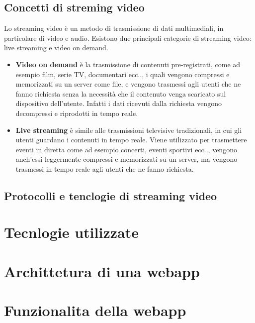 \subsection{Concetti di streming video}
Lo streaming video è un metodo di trasmissione di dati multimediali, in particolare di video e audio.
Esistono due principali categorie di streaming video: live streaming e video on demand.\\
\begin{itemize}
    \item \textbf{Video on demand} è la trasmissione di contenuti pre-registrati, come ad esempio film, serie TV, documentari ecc.., i quali vengono compressi e memorizzati su un server come file,
    e vengono trasmessi agli utenti che ne fanno richiesta senza la necessità che il contenuto venga scaricato sul dispositivo dell'utente. Infatti i dati ricevuti dalla richiesta vengono decompressi e riprodotti in tempo reale.
    \item \textbf{Live streaming} è simile alle trasmissioni televisive tradizionali, in cui gli utenti guardano i contenuti in tempo reale. Viene utilizzato per trasmettere eventi in 
    diretta come ad esempio concerti, eventi sportivi ecc.., vengono anch'essi leggermente compressi e memorizzati su un server, ma vengono trasmessi in tempo reale agli utenti che ne fanno richiesta.
    \end{itemize}
\subsection{Protocolli e tenclogie di streaming video}


\section{Tecnlogie utilizzate}

\section{Archittetura di una webapp}

\section{Funzionalita della webapp}